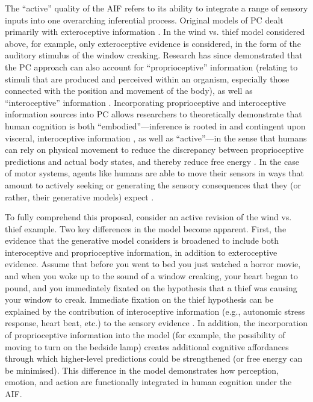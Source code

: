 \begin{CJK}{UTF8}{gbsn}
 The ``active'' quality of the AIF refers to its ability to integrate a range of sensory inputs into one overarching inferential process.  Original models of PC dealt primarily with exteroceptive information \citep[relating to stimuli that are external to an organism, i.e. visual, auditory, haptic perception;][]{Rao1999,Friston2010}.  In the wind vs. thief model considered above, for example, only exteroceptive evidence is considered, in the form of the auditory stimulus of the window creaking.  Research has since demonstrated that the PC approach can also account for ``proprioceptive'' information (relating to stimuli that are produced and perceived within an organism, especially those connected with the position and movement of the body), as well as ``interoceptive'' information  \citep[relating to stimuli produced within an organism, particularly by the body's organs (viscera) e.g., ``gut feelings,'' or elevated heart rate; see][]{Seth2013,FeldmanBarrett2015}.  Incorporating proprioceptive and interoceptive information sources into PC allows researchers to theoretically demonstrate that human cognition is both ``embodied''---inference is rooted in and contingent upon visceral, interoceptive information \citep[][]{Pezzulo2014}, as well as ``active''---in the sense that humans can rely on physical movement to reduce the discrepancy between proprioceptive predictions and actual body states, and thereby reduce free energy \citep[see][]{Friston2010,Clark2015}.  In the case of motor systems, agents like humans are able to move their sensors in ways that amount to actively seeking or generating the sensory consequences that they (or rather, their generative models) expect \citep[][1349]{Friston2003}.

To fully comprehend this proposal, consider an active revision of the wind vs. thief example.  Two key differences in the model become apparent.  First, the evidence that the generative model considers is broadened to include both interoceptive and proprioceptive information, in addition to exteroceptive evidence.  Assume that before you went to bed you just watched a horror movie, and when you woke up to the sound of a window creaking, your heart began to pound, and you immediately fixated on the hypothesis that a thief was causing your window to creak.  Immediate fixation on the thief hypothesis can be explained by the contribution of interoceptive information (e.g., autonomic stress response, heart beat, etc.) to the sensory evidence \citep{Pezzulo2014}.  In addition, the incorporation of proprioceptive information into the model (for example, the possibility of moving to turn on the bedside lamp) creates additional cognitive affordances through which higher-level predictions could be strengthened (or free energy can be minimised).  This difference in the model demonstrates how perception, emotion, and action are functionally integrated in human cognition under the AIF.


\end{CJK}
